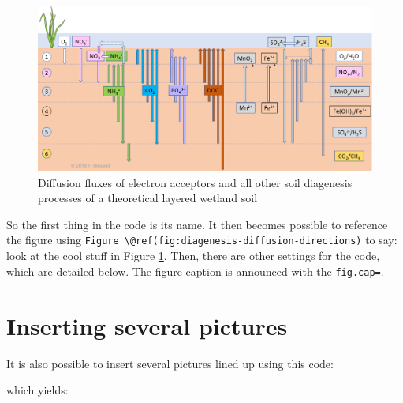 \documentclass[]{book}
\theoremstyle{definition}
\theoremstyle{definition}
\theoremstyle{definition}
\theoremstyle{remark}
\begin{document}
\begin{figure}

{\centering \includegraphics[width=1\linewidth]{pictures/diagenesis-diffusion-directions} 

}

\caption{Diffusion fluxes of electron acceptors and all other soil diagenesis processes of a theoretical layered wetland soil}\label{fig:diagenesis-diffusion-directions}
\end{figure}

So the first thing in the code is its name. It then becomes possible to
reference the figure using
\texttt{Figure\ \textbackslash{}@ref(fig:diagenesis-diffusion-directions)}
to say: look at the cool stuff in Figure
\ref{fig:diagenesis-diffusion-directions}. Then, there are other
settings for the code, which are detailed below. The figure caption is
announced with the \texttt{fig.cap=}.

\section{Inserting several pictures}\label{inserting-several-pictures}

It is also possible to insert several pictures lined up using this code:

which yields:
\end{document}
